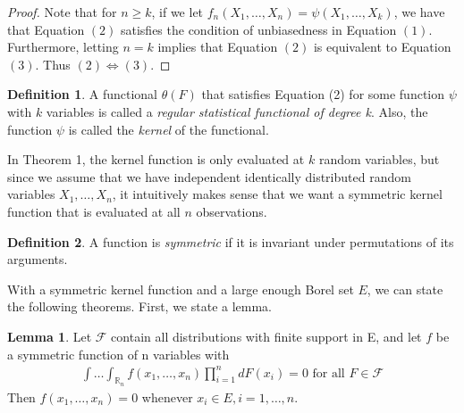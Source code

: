 \documentclass{article}
\newcommand{\R}{{\mathbb{R}}}
\theoremstyle{definition}
\newtheorem{Lemma}{Lemma}
\newtheorem{Def}{Definition}
\numberwithin{Def}{section}
\begin{document}
\begin{proof}
Note that for $n \geq k$, if we let $f_n(X_1, \dotsc, X_n) = \psi(X_1, \dotsc, X_k)$, we have that Equation $(2)$ satisfies the condition of unbiasedness in Equation $(1)$. Furthermore, letting $n=k$ implies that Equation $(2)$ is equivalent to Equation $(3)$. Thus $(2) \iff (3)$. 
\end{proof}

\begin{Def}
A functional $\theta(F)$ that satisfies Equation (2) for some function $\psi$ with $k$ variables is called a \textit{regular statistical functional of degree k}. Also, the function $\psi$ is called the \textit{kernel} of the functional. 
\end{Def}

In Theorem 1, the kernel function is only evaluated at $k$ random variables, but since we assume that we have independent identically distributed random variables $X_1, \dotsc, X_n$, it intuitively makes sense that we want a symmetric kernel function that is evaluated at all $n$ observations. 

\begin{Def}
A function is \textit{symmetric} if it is invariant under permutations of its arguments. 
\end{Def}

With a symmetric kernel function and a large enough Borel set $E$, we can state the following theorems. First, we state a lemma.

\begin{Lemma}\label{lemA}
Let $\mathcal{F}$ contain all distributions with finite support in E, and let $f$ be a symmetric function of n variables with 
    \begin{align*}
        \int \dotsc \int_{\R_n} f(x_1, \dotsc, x_n) \prod_{i=1}^n dF(x_i) = 0 \text{ for all } F \in \mathcal{F}
    \end{align*}
    Then $f(x_1, \dotsc, x_n) = 0$ whenever $x_i \in E, i = 1, \dotsc, n$. 
\end{Lemma}
\end{document}
